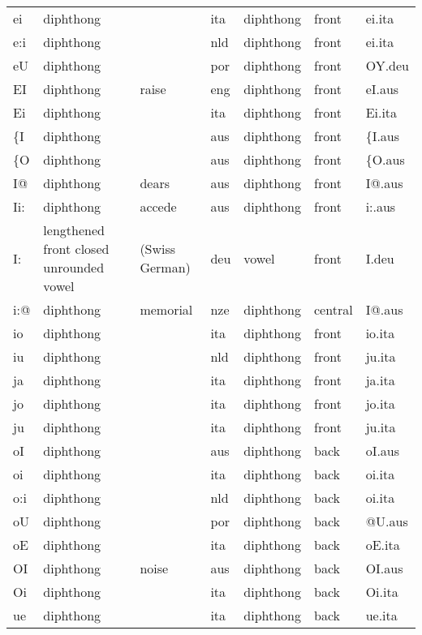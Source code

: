 \begin{longtable}{l|l|l|l|l|l|l}
ei	& diphthong	& 	& ita	& diphthong	& front	& ei.ita\\
e:i	& diphthong	& 	& nld	& diphthong	& front	& ei.ita\\
eU	& diphthong	& 	& por	& diphthong	& front\textgreaterback	& OY.deu\\
EI	& diphthong	& raise	& eng	& diphthong	& front	& eI.aus\\
Ei	& diphthong	& 	& ita	& diphthong	& front	& Ei.ita\\
\{I	& diphthong	& 	& aus	& diphthong	& front	& \{I.aus\\
\{O	& diphthong	& 	& aus	& diphthong	& front\textgreaterback	& \{O.aus\\
I@	& diphthong	& dears	& aus	& diphthong	& front\textgreatercentral	& I@.aus\\
Ii:	& diphthong	& accede	& aus	& diphthong	& front	& i:.aus\\
I:	& lengthened front closed unrounded vowel	& (Swiss German)	& deu	& vowel	& front	& I.deu\\
i:@	& diphthong	& memorial	& nze	& diphthong	& central\textgreaterfront	& I@.aus\\
io	& diphthong	& 	& ita	& diphthong	& front\textgreaterback	& io.ita\\
iu	& diphthong	& 	& nld	& diphthong	& front\textgreaterback	& ju.ita\\
ja	& diphthong	& 	& ita	& diphthong	& front	& ja.ita\\
jo	& diphthong	& 	& ita	& diphthong	& front\textgreaterback	& jo.ita\\
ju	& diphthong	& 	& ita	& diphthong	& front\textgreaterback	& ju.ita\\
oI	& diphthong	& 	& aus	& diphthong	& back\textgreaterfront	& oI.aus\\
oi	& diphthong	& 	& ita	& diphthong	& back\textgreaterfront	& oi.ita\\
o:i	& diphthong	& 	& nld	& diphthong	& back\textgreaterfront	& oi.ita\\
oU	& diphthong	& 	& por	& diphthong	& back	& @U.aus\\
oE	& diphthong	& 	& ita	& diphthong	& back\textgreaterfront	& oE.ita\\
OI	& diphthong	& noise	& aus	& diphthong	& back\textgreaterfront	& OI.aus\\
Oi	& diphthong	& 	& ita	& diphthong	& back\textgreaterfront	& Oi.ita\\
ue	& diphthong	& 	& ita	& diphthong	& back\textgreaterfront	& ue.ita\\

\end{longtable}
